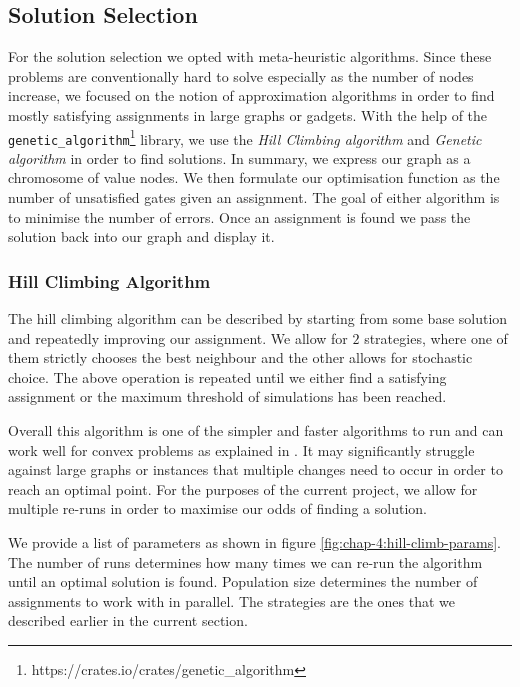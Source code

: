 \subsection{Solution Selection}

For the solution selection we opted with meta-heuristic algorithms. Since these problems are conventionally hard
to solve especially as the number of nodes increase, we focused on the notion of approximation
algorithms in order to find mostly satisfying assignments in large graphs or gadgets.
With the help of the \texttt{genetic\_algorithm}\footnote{https://crates.io/crates/genetic\_algorithm} library,
we use the \textit{Hill Climbing algorithm} and \textit{Genetic algorithm}  in order
to find solutions. 
In summary, we express our graph as a chromosome of value nodes.
We then formulate our optimisation function as the number of unsatisfied gates
given an assignment. The goal of either algorithm
is to minimise the number of errors. Once an assignment is found 
we pass the solution back into our graph and display it.



\subsubsection{Hill Climbing Algorithm}

The hill climbing algorithm can be described by starting from some base solution
and repeatedly improving our assignment. We allow for $2$ strategies, where one
of them strictly chooses the best neighbour and the other
allows for stochastic choice. The above operation is repeated
until we either find a satisfying assignment or
the maximum threshold of simulations has been reached.

Overall this algorithm is one of the simpler and faster algorithms to run and can work
well for convex problems as explained in \cite{schwefel_EvolutionOptimumSeeking_1995}.
It may significantly struggle against large graphs or instances
that multiple changes need to occur in order to reach an optimal point.
For the purposes of the current project, we allow for multiple re-runs
in order to maximise our odds of finding a solution.

We provide a list of parameters as shown in figure \ref{fig:chap-4:hill-climb-params}.
The number of runs determines how many times we can re-run the algorithm
until an optimal solution is found. Population size determines the number
of assignments to work with in parallel. The strategies are the ones that we described
earlier in the current section.


